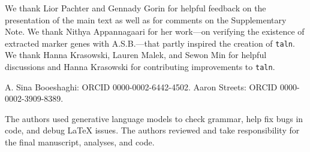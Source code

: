 \documentclass[pdflatex,lineno,referee,sn-vancouver-num]{sn-jnl}
\theoremstyle{thmstyleone}
\theoremstyle{thmstylethree}
\theoremstyle{thmstyletwo}
\begin{document}
We thank Lior Pachter and Gennady Gorin for helpful feedback on the presentation of the main text as well as for comments on the Supplementary Note. We thank Nithya Appannagaari for her work---on verifying the existence of extracted marker genes with A.S.B.---that partly inspired the creation of \texttt{taln}. We thank Hanna Krasowski, Lauren Malek, and Sewon Min for helpful discussions and Hanna Krasowski for contributing improvements to \texttt{taln}.

A. Sina Booeshaghi: ORCID 0000-0002-6442-4502. Aaron Streets: ORCID 0000-0002-3909-8389.

The authors used generative language models to check grammar, help fix bugs in code, and debug \LaTeX{} issues. The authors reviewed and take responsibility for the final manuscript, analyses, and code.


\end{document}
